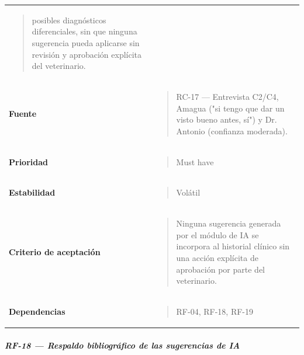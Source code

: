 \documentclass[
]{article}
\begin{document}
{\begin{longtable}[]{@{}
  >{\raggedright\arraybackslash}p{}
  >{\raggedright\arraybackslash}p{}@{}}
\begin{minipage}[t]{\linewidth}
\begin{quote}
posibles diagnósticos diferenciales, sin que ninguna sugerencia pueda
aplicarse sin revisión y aprobación explícita del veterinario.
\end{quote}
\end{minipage} \\
\textbf{Fuente} & \begin{minipage}[t]{\linewidth}\raggedright
\begin{quote}
RC-17 --- Entrevista C2/C4, Amagua ("si tengo que dar un visto bueno
antes, sí") y Dr. Antonio (confianza moderada).
\end{quote}
\end{minipage} \\
\textbf{Prioridad} & \begin{minipage}[t]{\linewidth}\raggedright
\begin{quote}
Must have
\end{quote}
\end{minipage} \\
\textbf{Estabilidad} & \begin{minipage}[t]{\linewidth}\raggedright
\begin{quote}
Volátil
\end{quote}
\end{minipage} \\
\textbf{Criterio de aceptación} &
\begin{minipage}[t]{\linewidth}\raggedright
\begin{quote}
Ninguna sugerencia generada por el módulo de IA se incorpora al
historial clínico sin una acción explícita de aprobación por parte del
veterinario.
\end{quote}
\end{minipage} \\
\textbf{Dependencias} & \begin{minipage}[t]{\linewidth}\raggedright
\begin{quote}
RF-04, RF-18, RF-19
\end{quote}
\end{minipage} \\
\end{longtable}
}

\subparagraph{RF-18 --- Respaldo bibliográfico de las sugerencias de
IA}\label{rf-18-respaldo-bibliogruxe1fico-de-las-sugerencias-de-ia}
\end{document}
